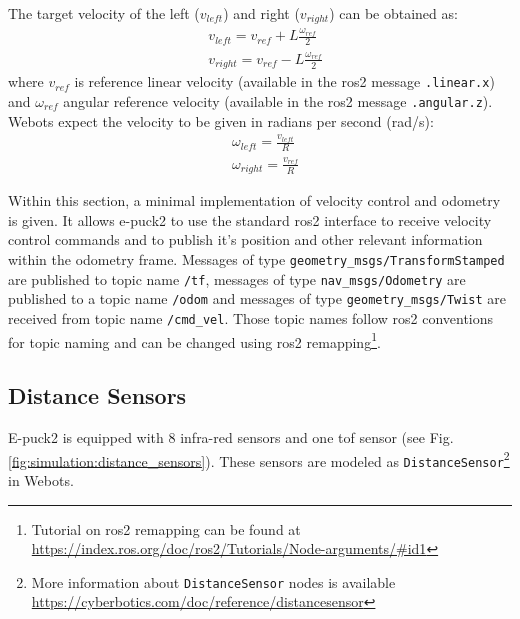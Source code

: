 The target velocity of the left ($v_{left}$) and right ($v_{right}$) can be obtained as:
\begin{equation}
\begin{aligned}
    & v_{left} = v_{ref} + L \frac{\omega_{ref}}{2} \\
    & v_{right} = v_{ref} - L \frac{\omega_{ref}}{2}
\end{aligned}
\end{equation}
where $ v_{ref}  $ is reference linear velocity (available in the \ac{ros2} message \texttt{.linear.x}) and $ \omega_{ref} $ angular reference velocity (available in the \ac{ros2} message \texttt{.angular.z}). Webots expect the velocity to be given in radians per second (rad/s):
\begin{equation}
\begin{aligned}
    & \omega_{left} = \frac{v_{left}}{R} \\
    & \omega_{right} = \frac{v_{ref}}{R} 
\end{aligned}
\end{equation}

Within this section, a minimal implementation of velocity control and odometry is given. It allows e-puck2 to use the standard \ac{ros2} interface to receive velocity control commands and to publish it's position and other relevant information within the odometry frame. Messages of type \texttt{geometry\_msgs/TransformStamped} are published to topic name \texttt{/tf}, messages of type \texttt{nav\_msgs/Odometry} are published to a topic name \texttt{/odom} and messages of type \texttt{geometry\_msgs/Twist} are received from topic name \texttt{/cmd\_vel}. Those topic names follow \ac{ros2} conventions for topic naming and can be changed using \ac{ros2} remapping\footnote{Tutorial on \ac{ros2} remapping can be found at \url{https://index.ros.org/doc/ros2/Tutorials/Node-arguments/\#id1}}. 

\subsection{Distance Sensors}
E-puck2 is equipped with 8 infra-red sensors and one \ac{tof} sensor (see Fig. \ref{fig:simulation:distance_sensors}). These sensors are modeled as \texttt{DistanceSensor}\footnote{More information about \texttt{DistanceSensor} nodes is available \url{https://cyberbotics.com/doc/reference/distancesensor}} in Webots.

